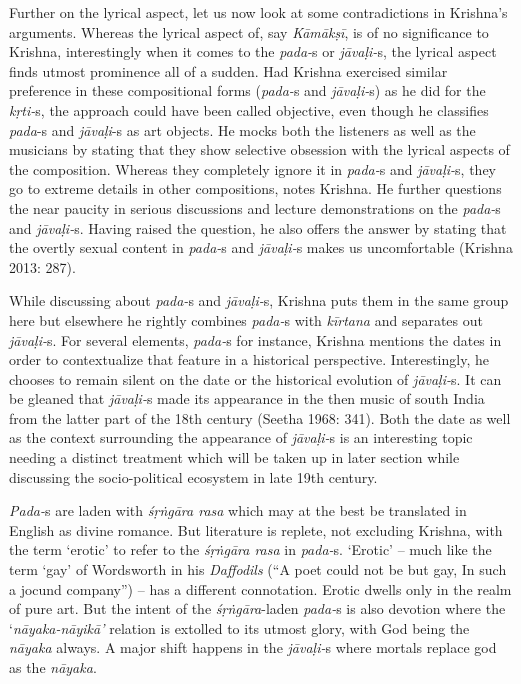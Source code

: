 Further on the lyrical aspect, let us now look at some contradictions in Krishna’s arguments. Whereas the lyrical aspect of, say \textit{Kāmākṣī}, is of no significance to Krishna, interestingly when it comes to the \textit{pada-}s or \textit{jāvaḷi-}s, the lyrical aspect finds utmost prominence all of a sudden. Had Krishna exercised similar preference in these compositional forms (\textit{pada-}s and \textit{jāvaḷi-}s) as he did for the \textit{kṛti-}s, the approach could have been called objective, even though he classifies \textit{pada}-s and \textit{jāvaḷi}-s as art objects. He mocks both the listeners as well as the musicians by stating that they show selective obsession with the lyrical aspects of the composition. Whereas they completely ignore it in \textit{pada-}s and \textit{jāvaḷi-}s, they go to extreme details in other compositions, notes Krishna. He further questions the near paucity in serious discussions and lecture demonstrations on the \textit{pada-}s and \textit{jāvaḷi-}s. Having raised the question, he also offers the answer by stating that the overtly sexual content in \textit{pada-}s and \textit{jāvaḷi-}s makes us uncomfortable (Krishna 2013: 287).

While discussing about \textit{pada-}s and \textit{jāvaḷi-}s, Krishna puts them in the same group here but elsewhere he rightly combines \textit{pada-}s with \textit{kīrtana} and separates out \textit{jāvaḷi-}s. For several elements, \textit{pada-}s for instance, Krishna mentions the dates in order to contextualize that feature in a historical perspective. Interestingly, he chooses to remain silent on the date or the historical evolution of \textit{jāvaḷi-}s. It can be gleaned that \textit{jāvaḷi-}s made its appearance in the then music of south India from the latter part of the 18th century (Seetha 1968: 341). Both the date as well as the context surrounding the appearance of \textit{jāvaḷi-}s is an interesting topic needing a distinct treatment which will be taken up in later section while discussing the socio-political ecosystem in late 19th century.

\textit{Pada-}s are laden with \textit{śṛṅgāra rasa} which may at the best be translated in English as divine romance. But literature is replete, not excluding Krishna, with the term ‘erotic’ to refer to the \textit{śṛṅgāra rasa} in \textit{pada-}s. ‘Erotic’ – much like the term ‘gay’ of Wordsworth in his \textit{Daffodils} (“A poet could not be but gay, In such a jocund company”) – has a different connotation. Erotic dwells only in the realm of pure art. But the intent of the \textit{śṛṅgāra}-laden \textit{pada-}s is also devotion where the ‘\textit{nāyaka-nāyikā’} relation is extolled to its utmost glory, with God being the \textit{nāyaka} always. A major shift happens in the \textit{jāvaḷi-}s where mortals replace god as the \textit{nāyaka}.

